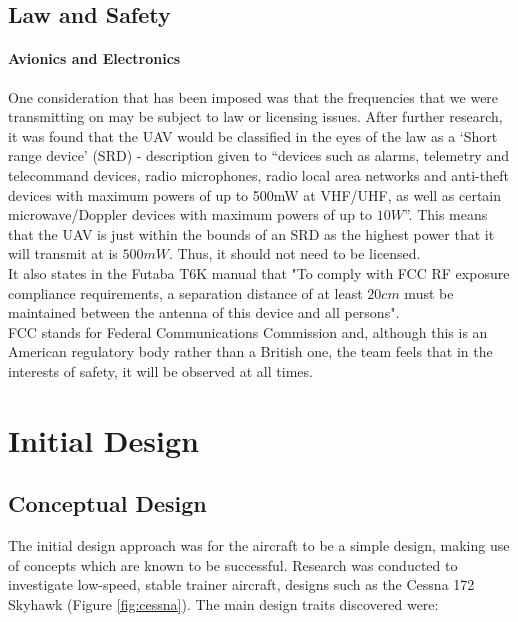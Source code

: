 \documentclass[12pt]{article}
\begin{document}
\subsection{Law and Safety}

\paragraph {Avionics and Electronics} One consideration that has been imposed was that the frequencies that we were transmitting on may be subject to law or licensing issues. After further research, it was found that the UAV would be classified in the eyes of the law as a ‘Short range device’ (SRD) - description given to “devices such as alarms, telemetry and telecommand devices, radio microphones, radio local area networks and anti-theft devices with maximum powers of up to 500mW at VHF/UHF, as well as certain microwave/Doppler devices with maximum powers of up to $10W$”. This means that the UAV is just within the bounds of an SRD as the highest power that it will transmit at is $500mW$. Thus, it should not need to be licensed.\cite{REFERENCE1} \\

\noindent It also states in the Futaba T6K manual that "To comply with FCC RF exposure compliance requirements, a separation distance of at least $20cm$ must be maintained between the antenna of this device and all persons".\cite{REFERENCE2} \\

\noindent FCC stands for Federal Communications Commission and, although this is an American regulatory body rather than a British one, the team feels that in the interests of safety, it will be observed at all times. \\

\section{Initial Design}

\subsection{Conceptual Design}
\noindent The initial design approach was for the aircraft to be a simple design, making use of concepts which are known to be successful. Research was conducted to investigate low-speed, stable trainer aircraft, designs such as the Cessna 172 Skyhawk (Figure \ref{fig:cessna}). The main design traits discovered were: 
\end{document}
